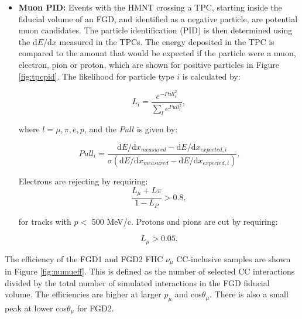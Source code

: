 \begin{itemize}
\item \textbf{Muon PID:} Events with the HMNT crossing a TPC, starting inside the fiducial volume of an FGD, and identified as a negative particle, are potential muon candidates. The particle identification (PID) is then determined using the d$E/$d$x$ measured in the TPCs. The energy deposited in the TPC is compared to the amount that would be expected if the particle were a muon, electron, pion or proton, which are shown for positive particles in Figure \ref{fig:tpcpid}. The likelihood for particle type $i$ is calculated by:

\begin{equation}
L_{i} = \frac{e^{-Pull_{i}^{2}}}{\sum_{l}e^{Pull_{l}^2}},
\end{equation}

where $l = \mu, \pi, e, p$, and the $Pull$ is given by:

\begin{equation}
Pull_{i} = \frac{\text{d}E/\text{d}x_{measured} - \text{d}E/\text{d}x_{expected,i}}{\sigma(\text{d}E/\text{d}x_{measured}-\text{d}E/\text{d}x_{expected,i})}.
\end{equation}

Electrons are rejecting by requiring:
\begin{equation}
\frac{L_{\mu}+L{\pi}}{1-L_P} > 0.8,
\end{equation}

for tracks with $p < $ 500 MeV/c. Protons and pions are cut by requiring:

\begin{equation}
L_{\mu} > 0.05.
\end{equation}
\end{itemize}

The efficiency of the FGD1 and FGD2 FHC $\nu_{\mu}$ CC-inclusive samples are shown in Figure \ref{fig:numueff}. This is defined as the number of selected CC interactions divided by the total number of simulated interactions in the FGD fiducial volume. The efficiencies are higher at larger $p_{\mu}$ and cos$\theta_{\mu}$. There is also a small peak at lower cos$\theta_{\mu}$ for FGD2.

